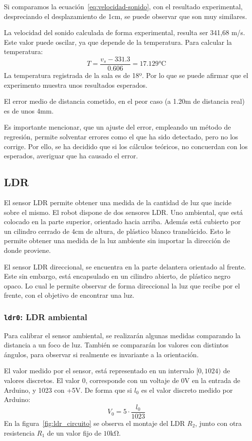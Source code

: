 \documentclass[10pt,a4paper,hidelinks,twocolumn]{article}
\begin{document}
Si comparamos la ecuación~\ref{eq:velocidad-sonido}, con el resultado 
experimental, despreciando el desplazamiento de 1cm, se puede observar que son 
muy similares.

La velocidad del sonido calculada de forma experimental, resulta ser 341,68 m/s.  
Este valor puede oscilar, ya que depende de la temperatura. Para calcular la 
temperatura:
$$ T = \frac{v_{s}-331.3}{0.606} = 17.129 \si{\celsius} $$
La temperatura registrada de la sala es de 18º. Por lo que se puede afirmar que 
el experimento muestra unos resultados esperados.

El error medio de distancia cometido, en el peor caso (a 1.20m de distancia 
real) es de unos 4mm.

Es importante mencionar, que un ajuste del error, empleando un método de 
regresión, permite solventar errores como el que ha sido detectado, pero no los 
corrige. Por ello, se ha decidido que si los cálculos teóricos, no concuerdan 
con los esperados, averiguar que ha causado el error.
\subsection{LDR}

El sensor LDR permite obtener una medida de la cantidad de luz que incide sobre 
el mismo. El robot dispone de dos sensores LDR. Uno ambiental, que está colocado 
en la parte superior, orientado hacia arriba. Además está cubierto por un 
cilindro cerrado de 4cm de altura, de plástico blanco translúcido. Esto le 
permite obtener una medida de la luz ambiente sin importar la dirección de donde 
proviene.

El sensor LDR direccional, se encuentra en la parte delantera orientado al 
frente. Este sin embargo, está encapsulado en un cilindro abierto, de plástico 
negro opaco. Lo cual le permite observar de forma direccional la luz que recibe 
por el frente, con el objetivo de encontrar una luz.
\subsubsection{\texttt{ldr0}: LDR ambiental}

Para calibrar el sensor ambiental, se realizarán algunas medidas comparando la 
distancia a un foco de luz. También se compararán los valores con distintos 
ángulos, para observar si realmente es invariante a la orientación.

El valor medido por el sensor, está representado en un intervalo $[0, 1024)$ de 
valores discretos. El valor 0, corresponde con un voltaje de 0V en la entrada de 
Arduino, y 1023 con +5V. De forma que si $l_0$ es el valor discreto medido por 
Arduino:
$$ V_0 = 5 \cdot \frac{l_0}{1023} $$
En la figura~\ref{fig:ldr_circuito} se observa el montaje del LDR $R_2$, junto 
con otra resistencia $R_1$ de un valor fijo de $10\si{\kohm}$.
\end{document}
